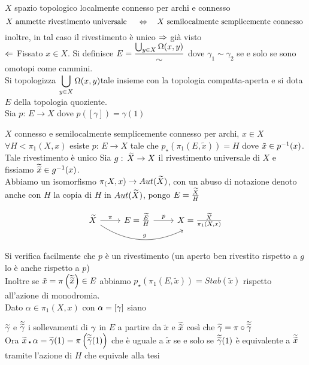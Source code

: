 \begin{thm}$X$ spazio topologico localmente connesso per archi e connesso
$$ X \text{ ammette rivestimento universale } \quad \Leftrightarrow \quad X \text{ semilocalmente semplicemente connesso }$$
inoltre, in tal caso il rivestimento \`e unico
\proof $\Rightarrow$ gi\`a visto\\
$\Leftarrow$ Fissato $x\in X$. Si definisce $E = \displaystyle \frac{\bigcup_{y \in X}\Omega(x,y)}{\sim}$ dove $\gamma_1\sim \gamma_2 $ se e solo se sono omotopi come cammini.\\ Si topologizza $\displaystyle \bigcup_{y \in X}\Omega(x,y)$tale insieme con la topologia compatta-aperta e si dota $E$ della topologia quoziente.\\
Sia $p:\, E \to X$ dove $p([\gamma])=\gamma(1)$
\end{thm}

\begin{thm}$X$ connesso e semilocalmente semplicemente  connesso per archi, $x\in X$\\
$\forall H < \pi_1(X,x) $ esiste $p:\,E \to X$ tale che $p_\star (\pi_1(E, \tilde{x}))=H$ dove $\tilde{x}\in p^{-1} (x)$.\\
Tale rivestimento \`e unico
\proof Sia $g:\, \widetilde{X} \to X$ il rivestimento universale di $X$ e fissiamo $\widetilde{\widetilde{x}}\in g^{-1} (x)$.\\
Abbiamo un isomorfismo $\pi_(X, x) \to Aut(\widetilde{X})$, con un abuso di notazione denoto anche con $H$ la copia di $H$ in $Aut(\widetilde{X})$, pongo $E=\frac{\widetilde{X}}{H}$

$$\begin{tikzcd}
\wt X\arrow{r}{\pi}  \arrow[bend right,rr,"g"]& E=\frac{\wt E}{H}\arrow[r,"p"] & X =\frac{\wt X}{\pi_1(X,x)} 
\end{tikzcd}$$
Si verifica facilmente che $p$ \`e un rivestimento (un aperto ben rivestito rispetto a $g$ lo \`e anche rispetto a $p$)\\
Inoltre se $\tilde{x}=\pi\left( \widetilde{\widetilde{x}}\right)\in E$ abbiamo $p_\star (\pi_1(E, \tilde{x}))=Stab(\tilde{x})$ rispetto all'azione di monodromia.\\
Dato $\alpha\in \pi_1(X,x)$ con $\alpha=[\gamma]$ siano 

$\widetilde{\gamma} $ e $\widetilde{\widetilde{\gamma}}$ i sollevamenti di $\gamma$ in $E$ a partire da $\tilde{x}$ e $\widetilde{\widetilde{x}}$ cos\`i che $\widetilde{\gamma} = \pi\circ \widetilde{\widetilde{\gamma}}$\\
Ora $\widetilde{x} \centerdot \alpha =\widetilde{\gamma}(1)= \pi \left( \widetilde{\widetilde{\gamma}}(1)\right)$ che \`e uguale a $\tilde{x}$ se e solo se $\widetilde{\widetilde{\gamma}}(1)$ \`e equivalente a $\widetilde{\widetilde{x}}$ tramite l'azione di $H$ che equivale alla tesi 
\end{thm}

